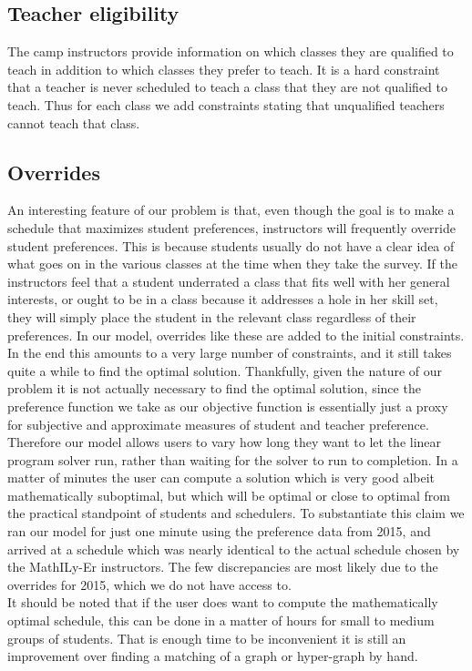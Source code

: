 \documentclass[11pt]{article}
\begin{document}
\subsection{Teacher eligibility}
The camp instructors provide information on which classes they are qualified to teach in addition to which classes they prefer to teach. It is a hard constraint that a teacher is never scheduled to teach a class that they are not qualified to teach. Thus for each class we add constraints stating that unqualified teachers cannot teach that class.
	\subsection{Overrides}
An interesting feature of our problem is that, even though the goal is to make a schedule that maximizes student preferences, instructors will frequently override student preferences. This is because students usually do not have a clear idea of what goes on in the various classes at the time when they take the survey. If the instructors feel that a student underrated a class that fits well with her general interests, or ought to be in a class because it addresses a hole in her skill set, they will simply place the student in the relevant class regardless of their preferences. In our model, overrides like these are added to the initial constraints.\\

	In the end this amounts to a very large number of constraints, and it still takes quite a while to find the optimal solution. Thankfully, given the nature of our problem it is not actually necessary to find the optimal solution, since the preference function we take as our objective function is essentially just a proxy for subjective and approximate measures of student and teacher preference. Therefore our model allows users to vary how long they want to let the linear program solver run, rather than waiting for the solver to run to completion. In a matter of minutes the user can compute a solution which is very good albeit mathematically suboptimal, but which will be optimal or close to optimal from the practical standpoint of students and schedulers. To substantiate this claim we ran our model for just one minute using the preference data from 2015, and arrived at a schedule which was nearly identical to the actual schedule chosen by the MathILy-Er instructors. The few discrepancies are most likely due to the overrides for 2015, which we do not have access to.\\
\indent It should be noted that if the user does want to compute the mathematically optimal schedule, this can be done in a matter of hours for small to medium groups of students.  That is enough time to be inconvenient it is still an improvement over finding a matching of a graph or hyper-graph by hand.
\end{document}

